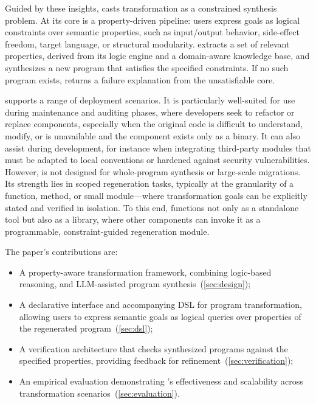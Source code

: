 \documentclass[a4paper,twoside,12pt]{report} %
\begin{document}
Guided by these insights, \sys casts transformation as a constrained synthesis problem.
At its core is a property-driven pipeline: users express goals as logical constraints over semantic properties, such as input/output behavior, side-effect freedom, target language, or structural modularity.
\sys extracts a set of relevant properties, derived from its logic engine and a domain-aware knowledge base, and synthesizes a new program that satisfies the specified constraints.
If no such program exists, \sys returns a failure explanation from the unsatisfiable core.

\sys supports a range of deployment scenarios.
It is particularly well-suited for use during maintenance and auditing phases, where developers seek to refactor or replace components, especially when the original code is difficult to understand, modify, or is unavailable and the component exists only as a binary.
It can also assist during development, for instance when integrating third-party modules that must be adapted to local conventions or hardened against security vulnerabilities.
However, \sys is not designed for whole-program synthesis or large-scale migrations.
Its strength lies in scoped regeneration tasks, typically at the granularity of a function, method, or small module---where transformation goals can be explicitly stated and verified in isolation.
To this end, \sys functions not only as a standalone tool but also as a
library, where other components can invoke it as a programmable,
constraint-guided regeneration module.


The paper's contributions are:
\begin{itemize}
  \item A property-aware transformation framework, combining logic-based reasoning, and LLM-assisted program synthesis~(\cref{sec:design});
 \item A declarative interface and accompanying DSL for program transformation, allowing users to express semantic goals as logical queries over properties of the regenerated program~(\cref{sec:dsl});
 \item A verification architecture that checks synthesized programs against the specified properties, providing feedback for refinement~(\cref{sec:verification});
 \item An empirical evaluation demonstrating \sys's effectiveness and scalability across transformation scenarios~(\cref{sec:evaluation}).
\end{itemize}
\end{document}
